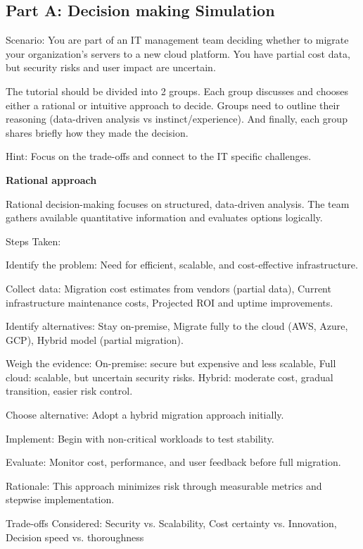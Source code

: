 \subsection{Part A: Decision making Simulation}

\indent 

Scenario: You are part of an IT management team deciding whether to migrate your organization’s servers to a new cloud platform. You have partial cost data, but security risks and user impact are uncertain.

The tutorial should be divided into 2 groups. Each group discusses and chooses either a rational or intuitive approach to decide. Groups need to outline their reasoning (data-driven analysis vs instinct/experience). And finally, each group shares briefly how they made the decision.

Hint: Focus on the trade-offs and connect to the IT specific challenges.

\noindent\textbf{Rational approach}

Rational decision-making focuses on structured, data-driven analysis. The team gathers available quantitative information and evaluates options logically.

Steps Taken:

\step Identify the problem: Need for efficient, scalable, and cost-effective infrastructure.

\step Collect data: Migration cost estimates from vendors (partial data), Current infrastructure maintenance costs, Projected ROI and uptime improvements.

\step Identify alternatives: Stay on-premise, Migrate fully to the cloud (AWS, Azure, GCP), Hybrid model (partial migration).

\step Weigh the evidence: On-premise: secure but expensive and less scalable, Full cloud: scalable, but uncertain security risks. Hybrid: moderate cost, gradual transition, easier risk control.

\step Choose alternative: Adopt a hybrid migration approach initially.

\step Implement: Begin with non-critical workloads to test stability.

\step Evaluate: Monitor cost, performance, and user feedback before full migration.

\step Rationale: This approach minimizes risk through measurable metrics and stepwise implementation.

\step Trade-offs Considered: Security vs. Scalability, Cost certainty vs. Innovation, Decision speed vs. thoroughness

